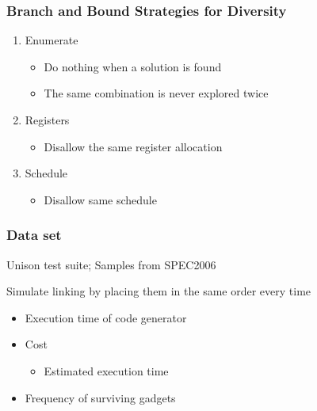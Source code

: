 \begin{frame}
	\frametitle{Branch and Bound Strategies for Diversity}

	\begin{enumerate}
		\item Enumerate
			\begin{itemize}
				\item Do nothing when a solution is found
				\item The same combination is never explored twice
			\end{itemize}
		\item Registers
			\begin{itemize}
				\item Disallow the same register allocation
			\end{itemize}
		\item Schedule
			\begin{itemize}
				\item Disallow same schedule
			\end{itemize}
	\end{enumerate}

\end{frame}

\begin{frame}
	\frametitle{Data set}

	Unison test suite; Samples from SPEC2006

	\vspace{0.5cm}

	Simulate linking by placing them in the same order every time

	\vspace{0.5cm}
	
	\begin{itemize}
		\item	Execution time of code generator
		\item Cost
			\begin{itemize}
				\item	Estimated execution time
			\end{itemize}
		\item	Frequency of surviving gadgets
	\end{itemize}

\end{frame}

